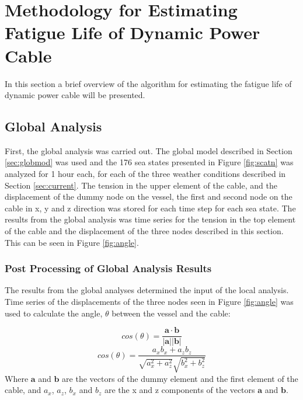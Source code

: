 \chapter{Methodology for Estimating Fatigue Life of Dynamic Power Cable }
\label{chap:estimation}
In this section a brief overview of the algorithm for estimating the fatigue life of dynamic power cable will be presented. 
\section{Global Analysis}
First, the global analysis was carried out. The global model described in Section \ref{sec:globmod} was used and the 176 sea states presented in Figure \ref{fig:scatn} was analyzed for 1 hour each, for each of the three weather conditions described in Section \ref{sec:current}. The  tension in the upper element of the cable, and the displacement of the dummy node on the vessel, the first and second node on the cable in x, y and z direction was stored for each time step for each sea state. The results from the global analysis was time series for the tension in the top element of the cable and the displacement of the three nodes described in this section. This can be seen in Figure \ref{fig:angle}.

\subsection{Post Processing of Global Analysis Results}
The results from the global analyses determined the input of the local analysis. Time series of the displacements of the three nodes seen in Figure \ref{fig:angle} was used to calculate the angle, $\theta$ between the vessel and the cable: 

\begin{equation}
    cos(\theta) = \frac{\boldsymbol{a \cdot b}}{|\boldsymbol{a}||\boldsymbol{b}| }
\end{equation}
\begin{equation}
    cos(\theta) = \frac{a_x b_x + a_z b_z}{\sqrt{a_x^2 +a_z^2}\sqrt{b_x^2 +b_z^2}}
\end{equation}
Where $\boldsymbol{a}$ and $\boldsymbol{b}$ are the vectors of the dummy element and the first element of the cable, and $a_x$, $a_z$, $b_x$ and $b_z$ are the x and z components of the vectors $\boldsymbol{a}$ and $\boldsymbol{b}$. 

